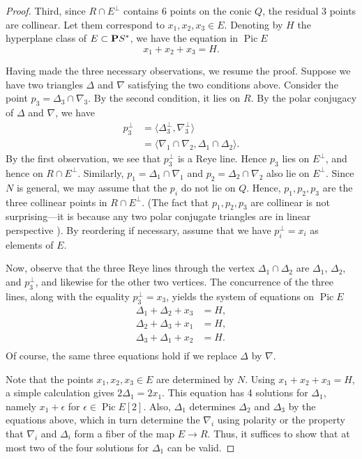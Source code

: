 \documentclass{amsart}
\renewcommand {\P}{{\bf P}}
\providecommand{\Pic}{\operatorname{Pic}}
\numberwithin{equation}{section}
\begin{document}
\begin{proof}
  Third, since $R \cap E^\perp$ contains 6 points on the conic $Q$, the residual 3 points are collinear.
  Let them correspond to $x_1, x_2, x_3 \in E$.
  Denoting by $H$ the hyperplane class of $E \subset \P S^*$, we have the equation in $\Pic E$
  \[ x_1 + x_2 + x_3 = H.\]

  Having made the three necessary observations, we resume the proof.
  Suppose we have two triangles $\Delta$ and $\nabla$ satisfying the two conditions above.
  Consider the point $p_3 = \Delta_3 \cap \nabla_3$.
  By the second condition, it lies on $R$.
  By the polar conjugacy of $\Delta$ and $\nabla$, we have
  \begin{align*}
    p_3^\perp &= \langle \Delta_3^\perp, \nabla_3^\perp \rangle \\
              &= \langle  \nabla_1 \cap \nabla_2, \Delta_1 \cap \Delta_2\rangle.
  \end{align*}
  By the first observation, we see that $p_3^\perp$ is a Reye line.
  Hence $p_3$ lies on $E^\perp$, and hence on $R \cap E^\perp$.
  Similarly, $p_1 = \Delta_1 \cap \nabla_1$ and $p_2 = \Delta_2 \cap \nabla_2$ also lie on $E^\perp$.
  Since $N$ is general, we may assume that the $p_i$ do not lie on $Q$.
  Hence, $p_1, p_2, p_3$ are the three collinear points in $R \cap E^\perp$.
  (The fact that $p_1, p_2, p_3$ are collinear is not surprising---it is because any two polar conjugate triangles are in linear perspective \cite[Theorem~2.1.9]{dol:12}).
  By reordering if necessary, assume that we have $p_i^\perp = x_i$ as elements of $E$.

  Now, observe that the three Reye lines through the vertex $\Delta_1 \cap \Delta_2$ are $\Delta_1$, $\Delta_2$, and $p_3^\perp$, and likewise for the other two vertices.
  The concurrence of the three lines, along with the equality $p_3^\perp = x_3$, yields the system of equations on $\Pic E$
  \begin{align*}
    \Delta_1 + \Delta_2 + x_3 &= H, \\
    \Delta_2 + \Delta_3 + x_1 &= H, \\
    \Delta_3 + \Delta_1 + x_2 &= H. \\
  \end{align*}
  Of course, the same three equations hold if we replace $\Delta$ by $\nabla$.

  Note that the points $x_1, x_2, x_3 \in E$ are determined by $N$.
  Using $x_1 + x_2 + x_3 = H$, a simple calculation gives $2 \Delta_1 = 2x_1$.
  This equation has 4 solutions for $\Delta_1$, namely $x_1 + \epsilon$ for $\epsilon \in \Pic E[2]$.
  Also, $\Delta_1$ determines $\Delta_2$ and $\Delta_3$ by the equations above, which in turn determine the $\nabla_i$ using polarity or the property that $\nabla_i$ and $\Delta_i$ form a fiber of the map $E \to R$.
  Thus, it suffices to show that at most two of the four solutions for $\Delta_1$ can be valid.


\end{proof}
\end{document}
